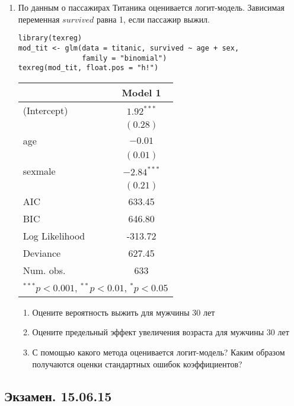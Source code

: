 \documentclass[12pt, a4paper]{article}
\theoremstyle{definition}
\begin{document}
\begin{enumerate}
\newpage
\item По данным о пассажирах Титаника оценивается логит-модель. Зависимая переменная $survived$ равна 1, если пассажир выжил.

\begin{verbatim}
library(texreg)
mod_tit <- glm(data = titanic, survived ~ age + sex,
               family = "binomial")
texreg(mod_tit, float.pos = "h!")
\end{verbatim}


\begin{tabular}{l c }
\hline
 & Model 1 \\
\hline
(Intercept)    & $1.92^{***}$  \\
               & $(0.28)$      \\
age            & $-0.01$       \\
               & $(0.01)$      \\
sexmale        & $-2.84^{***}$ \\
               & $(0.21)$      \\
\hline
AIC            & 633.45        \\
BIC            & 646.80        \\
Log Likelihood & -313.72       \\
Deviance       & 627.45        \\
Num. obs.      & 633           \\
\hline
\multicolumn{2}{l}{\scriptsize{$^{***}p<0.001$, $^{**}p<0.01$, $^*p<0.05$}}
\end{tabular}


\begin{enumerate}
\item Оцените вероятность выжить для мужчины 30 лет
\item Оцените предельный эффект увеличения возраста для мужчины 30 лет
\item С помощью какого метода оценивается логит-модель? Каким образом получаются оценки стандартных ошибок коэффициентов?
\end{enumerate}


\end{enumerate}


\subsection{Экзамен. 15.06.15}
\end{document}
